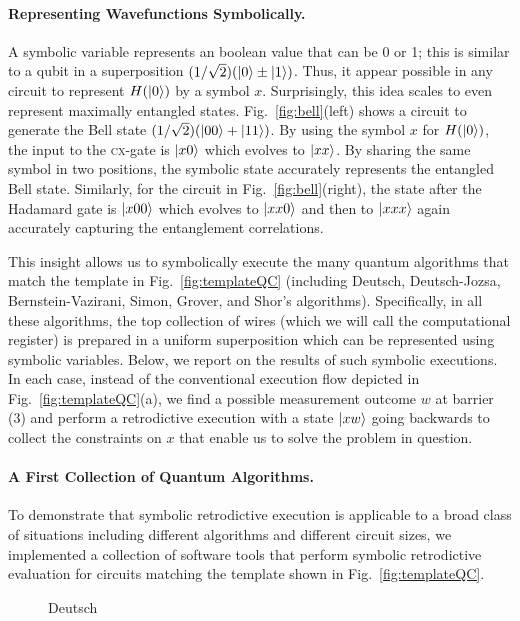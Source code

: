 \documentclass{article}
\newcommand{\cx}{\textsc{cx}}
\begin{document}
\begin{refsection}
\paragraph*{Representing Wavefunctions Symbolically.}
A symbolic variable represents an boolean value that can be 0 or 1;
this is similar to a qubit in a superposition $(1/\sqrt{2}) (\ket{0}
\pm \ket{1})$. Thus, it appear possible in any circuit to represent
$H(\ket{0})$ by a symbol $x$. Surprisingly, this idea scales to even
represent maximally entangled states. Fig.~\ref{fig:bell}(left) shows
a circuit to generate the Bell state $(1/\sqrt{2}) (\ket{00} +
\ket{11})$. By using the symbol $x$ for $H(\ket{0})$, the input to the
\cx-gate is $\ket{x0}$ which evolves to $\ket{xx}$. By sharing the
same symbol in two positions, the symbolic state accurately represents
the entangled Bell state. Similarly, for the circuit in
Fig.~\ref{fig:bell}(right), the state after the Hadamard gate is
$\ket{x00}$ which evolves to $\ket{xx0}$ and then to $\ket{xxx}$ again
accurately capturing the entanglement correlations.

This insight allows us to symbolically execute the many quantum
algorithms that match the template in Fig.~\ref{fig:templateQC}
(including Deutsch, Deutsch-Jozsa, Bernstein-Vazirani, Simon, Grover,
and Shor's algorithms). Specifically, in all these algorithms, the top
collection of wires (which we will call the computational register) is
prepared in a uniform superposition which can be represented using
symbolic variables. Below, we report on the results of such symbolic
executions. In each case, instead of the conventional execution flow
depicted in Fig.~\ref{fig:templateQC}(a), we find a possible
measurement outcome $w$ at barrier (3) and perform a retrodictive
execution with a state $\ket{xw}$ going backwards to collect the
constraints on $x$ that enable us to solve the problem in question.

\paragraph*{A First Collection of Quantum Algorithms.}
To demonstrate that symbolic retrodictive execution is applicable to a
broad class of situations including different algorithms and different
circuit sizes, we implemented a collection of software tools that
perform symbolic retrodictive evaluation for circuits matching the
template shown in Fig.~\ref{fig:templateQC}. 

\begin{wrapfigure}{r}{4cm}
\caption{\label{fig:deutsch}Deutsch}
\end{wrapfigure}

\end{refsection}
\end{document}
